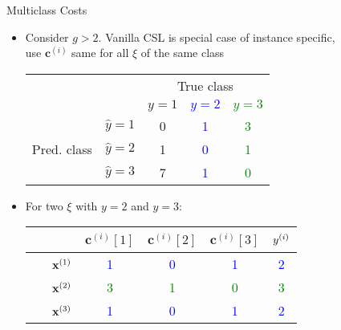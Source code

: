 \documentclass[11pt,compress,t,notes=noshow, xcolor=table]{beamer}
\newcommand{\cv}{\mathbf{c}}
\begin{document}
\begin{vbframe}{Multiclass Costs}
    \begin{itemize}

        \item Consider $g > 2$. Vanilla CSL is special case of instance specific,\\use $\cv^{(i)}$ same for all $\xi$ of the same class
        
        \vspace{5pt}
        \begin{center}
                            \begin{tabular}{cc|ccc}
        			& &\multicolumn{3}{c}{True class} \\
        			& & $y=1$ & \textcolor{blue}{$y=2$} & \textcolor{green}{$y=3$}  \\
        			\hline
        			\multirow{3}{*}{\parbox{0.6cm}{Pred.  class}} & $\hat y=1$ & 0 & \textcolor{blue}{1} & \textcolor{green}{3}\\
        			& $\hat y=2$ & 1 & \textcolor{blue}{0} & \textcolor{green}{1}\\
                        & $\hat y=3$ & 7 & \textcolor{blue}{1} & \textcolor{green}{0}\\
                \end{tabular}
        \end{center}
        \vspace{5pt}
        
        \item For two $\xi$ with $y=2$ and $y = 3$: %
                \vspace{5pt}

                \begin{center}
                            \begin{tabular}{cc|cccc}\
        			& & $\cv^{(i)}[1]$ & $\cv^{(i)}[2]$ & $\cv^{(i)}[3]$ & $y^{(i)}$ \\
        			\hline & $\mathbf{x}^{(1)}$ & \textcolor{blue}{1} & \textcolor{blue}{0} & \textcolor{blue}{1} & \textcolor{blue}{2}\\
        			& $\mathbf{x}^{(2)}$ & \textcolor{green}{3} & \textcolor{green}{1} & \textcolor{green}{0} & \textcolor{green}{3}\\
                        & $\mathbf{x}^{(3)}$ & \textcolor{blue}{1} & \textcolor{blue}{0} & \textcolor{blue}{1} & \textcolor{blue}{2}\\
                \end{tabular}
        \end{center}


\end{itemize}
\end{vbframe}
\end{document}
